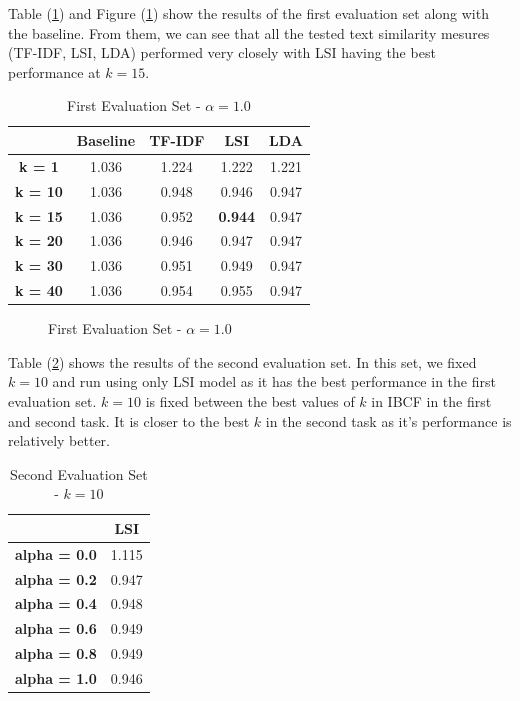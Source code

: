 \documentclass{sigish}
\begin{document}
Table (\ref{tab:eval_01}) and Figure (\ref{fig:eval_01}) show the results of the first evaluation set along with the baseline. From them, we can see that all the tested text similarity mesures (TF-IDF, LSI, LDA) performed very closely with LSI having the best performance at $ k = 15 $.

\begin{table}[]
\centering
\begin{tabular}{|c|c|c|c|c|}
\hline
                & \textbf{Baseline} & \textbf{TF-IDF} & \textbf{LSI}   & \textbf{LDA} \\ \hline
\textbf{k = 1}  & 1.036             & 1.224           & 1.222          & 1.221            \\ \hline
\textbf{k = 10} & 1.036             & 0.948           & 0.946          & 0.947            \\ \hline
\textbf{k = 15} & 1.036             & 0.952           & \textbf{0.944} & 0.947            \\ \hline
\textbf{k = 20} & 1.036             & 0.946           & 0.947          & 0.947            \\ \hline
\textbf{k = 30} & 1.036             & 0.951           & 0.949          & 0.947            \\ \hline
\textbf{k = 40} & 1.036             & 0.954           & 0.955          & 0.947            \\ \hline
\end{tabular}
\caption{First Evaluation Set - $ \alpha = 1.0 $}
\label{tab:eval_01}
\end{table}

\begin{figure}
\centering
\caption{First Evaluation Set - $ \alpha = 1.0 $}
\label{fig:eval_01}
\end{figure}

Table (\ref{tab:eval_02}) shows the results of the second evaluation set. In this set, we fixed $ k = 10 $ and run using only LSI model as it has the best performance in the first evaluation set. $ k = 10 $ is fixed between the best values of $ k $ in IBCF in the first and second task. It is closer to the best $ k $ in the second task as it's performance is relatively better.

\begin{table}[]
\centering
\begin{tabular}{|c|c|}
\hline
                     & \textbf{LSI} \\ \hline
\textbf{alpha = 0.0} & 1.115        \\ \hline
\textbf{alpha = 0.2} & 0.947        \\ \hline
\textbf{alpha = 0.4} & 0.948        \\ \hline
\textbf{alpha = 0.6} & 0.949        \\ \hline
\textbf{alpha = 0.8} & 0.949        \\ \hline
\textbf{alpha = 1.0} & 0.946        \\ \hline

\end{tabular}
\caption{Second Evaluation Set - $ k = 10 $}
\label{tab:eval_02}
\end{table}
\end{document}
